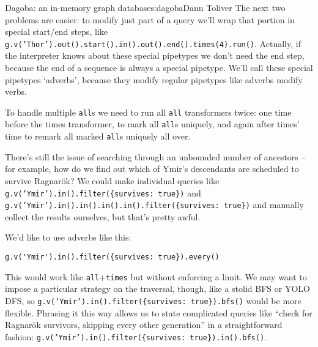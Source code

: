 \begin{aosachapter}{Dagoba: an in-memory graph database}{s:dagoba}{Dann Toliver}
The next two problems are easier: to modify just part of a query we'll
wrap that portion in special start/end steps, like
\texttt{g.v('Thor').out().start().in().out().end().times(4).run()}.
Actually, if the interpreter knows about these special pipetypes we
don't need the end step, because the end of a sequence is always a
special pipetype. We'll call these special pipetypes `adverbs', because
they modify regular pipetypes like adverbs modify verbs.

To handle multiple \texttt{all}s we need to run all \texttt{all}
transformers twice: one time before the times transformer, to mark all
\texttt{all}s uniquely, and again after times' time to remark all marked
\texttt{all}s uniquely all over.

There's still the issue of searching through an unbounded number of
ancestors -- for example, how do we find out which of Ymir's descendants
are scheduled to survive Ragnarök? We could make individual queries like
\texttt{g.v('Ymir').in().filter(\{survives: true\})} and
\newline \texttt{g.v('Ymir').in().in().in().in().filter(\{survives: true\})}
and manually collect the results ourselves, but that's pretty awful.

We'd like to use adverbs like this:

\begin{verbatim}
g.v('Ymir').in().filter({survives: true}).every()
\end{verbatim}

This would work like \texttt{all}+\texttt{times} but without enforcing a
limit. We may want to impose a particular strategy on the traversal,
though, like a stolid BFS or YOLO DFS, so
\newline \texttt{g.v('Ymir').in().filter(\{survives: true\}).bfs()}
would be more flexible. Phrasing it this way allows us to state
complicated queries like ``check for Ragnarök survivors, skipping every
other generation'' in a straightforward fashion:
\texttt{g.v('Ymir').in().filter(\{survives: true\}).in().bfs()}.

\label{wrapping-up}


\end{aosachapter}
